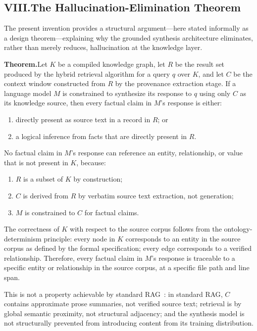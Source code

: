 \documentclass[12pt]{article}
\begin{document}
\subsection{VIII.\quad The Hallucination-Elimination Theorem}

The present invention provides a structural argument---here stated informally as
a design theorem---explaining why the grounded synthesis architecture eliminates,
rather than merely reduces, hallucination at the knowledge layer.

\bigskip
\noindent\textbf{Theorem.}\quad Let $K$ be a compiled knowledge graph, let $R$ be
the result set produced by the hybrid retrieval algorithm for a query $q$ over
$K$, and let $C$ be the context window constructed from $R$ by the provenance
extraction stage. If a language model $M$ is constrained to synthesize its
response to $q$ using only $C$ as its knowledge source, then every factual claim
in $M$'s response is either:
\begin{enumerate}[label=(\alph*), leftmargin=2em]
  \item directly present as source text in a record in $R$; or
  \item a logical inference from facts that are directly present in $R$.
\end{enumerate}

No factual claim in $M$'s response can reference an entity, relationship, or
value that is not present in $K$, because:
\begin{enumerate}[label=(\roman*), leftmargin=2em]
  \item $R$ is a subset of $K$ by construction;
  \item $C$ is derived from $R$ by verbatim source text extraction, not
    generation;
  \item $M$ is constrained to $C$ for factual claims.
\end{enumerate}

The correctness of $K$ with respect to the source corpus follows from the
ontology-determinism principle: every node in $K$ corresponds to an entity in the
source corpus as defined by the formal specification; every edge corresponds to a
verified relationship. Therefore, every factual claim in $M$'s response is
traceable to a specific entity or relationship in the source corpus, at a
specific file path and line span.

This is not a property achievable by standard RAG~\cite{lewis2020rag}: in
standard RAG, $C$ contains approximate prose summaries, not verified source text;
retrieval is by global semantic proximity, not structural adjacency; and the
synthesis model is not structurally prevented from introducing content from its
training distribution.
\end{document}
